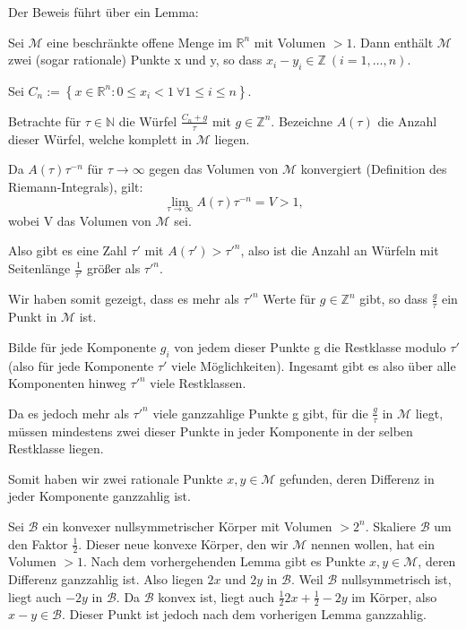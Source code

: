 \documentclass[10pt]{scrbook}
\begin{document}
Der Beweis führt über ein Lemma:
\begin{Le}
Sei $\mathcal{M}$ eine beschränkte offene Menge im $\mathbb{R}^n$ mit Volumen $>1$. Dann enthält $\mathcal{M}$ zwei (sogar rationale) Punkte x und y, so dass $x_i-y_i\in\mathbb{Z}\ (i=1, \ldots, n)$.
\end{Le}
\begin{bew}
Sei $C_n:=\left\{x\in\mathbb{R}^n: 0\leq x_i<1\ \forall 1\leq i\leq n\right\}$. 

Betrachte für $\tau\in\mathbb{N}$ die Würfel $\frac{C_n+g}{\tau}$ mit $g\in\mathbb{Z}^n$. Bezeichne $A(\tau)$ die Anzahl dieser Würfel, welche komplett in $\mathcal{M}$ liegen.

Da $A(\tau) \tau^{-n}$ für $\tau\rightarrow \infty$ gegen das Volumen von $\mathcal{M}$ konvergiert (Definition des Riemann-Integrals), gilt: 
\begin{displaymath}
	\lim_{\tau\rightarrow \infty} A(\tau) \tau^{-n}=V>1,
\end{displaymath}
wobei V das Volumen von $\mathcal{M}$ sei.

Also gibt es eine Zahl $\tau'$ mit $A(\tau')>{\tau'}^n$, also ist die Anzahl an Würfeln mit Seitenlänge $\frac{1}{\tau'}$ größer als ${\tau'}^n$.

Wir haben somit gezeigt, dass es mehr als ${\tau'}^n$ Werte für $g\in\mathbb{Z}^n$ gibt, so dass $\frac{g}{\tau}$ ein Punkt in $\mathcal{M}$ ist.

Bilde für jede Komponente $g_i$ von jedem dieser Punkte g die Restklasse modulo $\tau'$ (also für jede Komponente $\tau'$ viele Möglichkeiten). Ingesamt gibt es also über alle Komponenten hinweg $\tau'^n$ viele Restklassen.

Da es jedoch mehr als $\tau'^n$ viele ganzzahlige Punkte g gibt, für die $\frac{g}{\tau}$ in $\mathcal{M}$ liegt, müssen mindestens zwei dieser Punkte in jeder Komponente in der selben Restklasse liegen.

Somit haben wir zwei rationale Punkte $x, y\in \mathcal{M}$ gefunden, deren Differenz in jeder Komponente ganzzahlig ist.
\end{bew}

\begin{bew}
Sei $\mathcal{B}$ ein konvexer nullsymmetrischer Körper mit Volumen $>2^n$. Skaliere $\mathcal{B}$ um den Faktor $\frac{1}{2}$. Dieser neue konvexe Körper, den wir $\mathcal{M}$ nennen wollen, hat ein Volumen $>1$. Nach dem vorhergehenden Lemma gibt es Punkte $x, y\in \mathcal{M}$, deren Differenz ganzzahlig ist. Also liegen $2 x$ und $2 y$ in $\mathcal{B}$. Weil $\mathcal{B}$ nullsymmetrisch ist, liegt auch $-2 y$ in $\mathcal{B}$. Da $\mathcal{B}$ konvex ist, liegt auch $\frac{1}{2} 2 x+\frac{1}{2} -2 y$ im Körper, also $x-y\in \mathcal{B}$. Dieser Punkt ist jedoch nach dem vorherigen Lemma ganzzahlig.
\end{bew}
\end{document}
